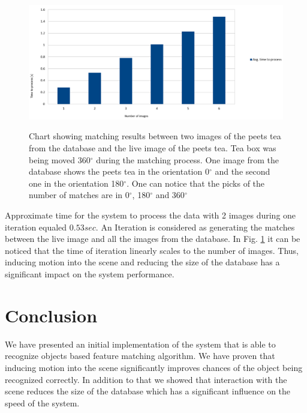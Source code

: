 \begin{figure}

\includegraphics[width=1.5\columnwidth]{figures/thesis-time.png}\\


\caption{Chart showing matching results between two images of the peets tea from the database and the live image of the peets tea. Tea box was being moved 360$^\circ$ during the matching process. One image from the database shows the peets tea in the orientation 0$^\circ$ and the second one in the orientation 180$^\circ$. One can notice that the picks of the number of matches are in 0$^\circ$, 180$^\circ$ and 360$^\circ$}
\label{fig:recognition-time}
\end{figure}

Approximate time for the system to process the data with 2 images during one iteration equaled $0.53 sec$. An Iteration is considered as generating the matches between the live image and all the images from the database. In Fig. \ref{fig:recognition-time} it can be noticed that the time of iteration linearly scales to the number of images. Thus, inducing motion into the scene and reducing the size of the database has a significant impact on the system performance.





\section{Conclusion}
We have presented an initial implementation of the system that is able to recognize objects based feature matching algorithm. We have proven that inducing motion into the scene significantly improves chances of the object being recognized correctly. In addition to that we showed that interaction with the scene reduces the size of the database which has a significant influence on the speed of the system.  
